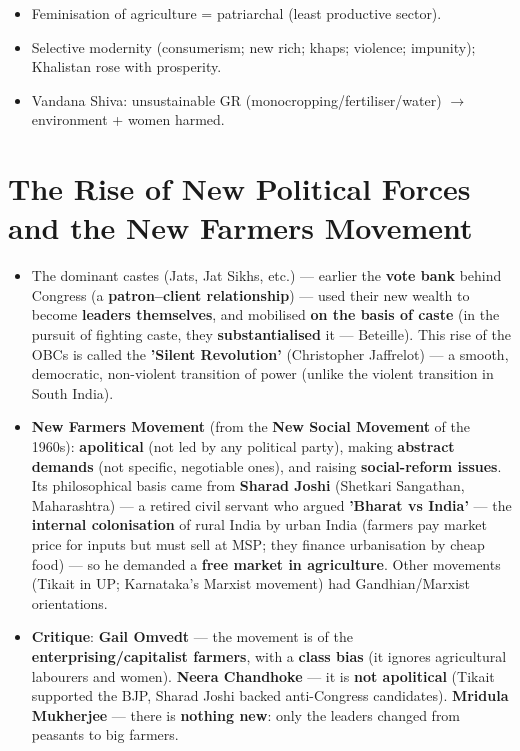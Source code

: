 \begin{QuickRevision}
\begin{itemize}
\item Feminisation of agriculture = patriarchal (least productive sector).
\item Selective modernity (consumerism; new rich; khaps; violence; impunity); Khalistan rose with prosperity.
\item Vandana Shiva: unsustainable GR (monocropping/fertiliser/water) $\rightarrow$ environment + women harmed.
\end{itemize}
\end{QuickRevision}

\section{The Rise of New Political Forces and the New Farmers Movement}

\begin{KeyConcept}
\begin{itemize}
\item The dominant castes (Jats, Jat Sikhs, etc.) --- earlier the \textbf{vote bank} behind Congress (a \textbf{patron--client relationship}) --- used their new wealth to become \textbf{leaders themselves}, and mobilised \textbf{on the basis of caste} (in the pursuit of fighting caste, they \textbf{substantialised} it --- Beteille). This rise of the OBCs is called the \textbf{'Silent Revolution'} (Christopher Jaffrelot) --- a smooth, democratic, non-violent transition of power (unlike the violent transition in South India).
\item \textbf{New Farmers Movement} (from the \textbf{New Social Movement} of the 1960s): \textbf{apolitical} (not led by any political party), making \textbf{abstract demands} (not specific, negotiable ones), and raising \textbf{social-reform issues}. Its philosophical basis came from \textbf{Sharad Joshi} (Shetkari Sangathan, Maharashtra) --- a retired civil servant who argued \textbf{'Bharat vs India'} --- the \textbf{internal colonisation} of rural India by urban India (farmers pay market price for inputs but must sell at MSP; they finance urbanisation by cheap food) --- so he demanded a \textbf{free market in agriculture}. Other movements (Tikait in UP; Karnataka's Marxist movement) had Gandhian/Marxist orientations.
\item \textbf{Critique}: \textbf{Gail Omvedt} --- the movement is of the \textbf{enterprising/capitalist farmers}, with a \textbf{class bias} (it ignores agricultural labourers and women). \textbf{Neera Chandhoke} --- it is \textbf{not apolitical} (Tikait supported the BJP, Sharad Joshi backed anti-Congress candidates). \textbf{Mridula Mukherjee} --- there is \textbf{nothing new}: only the leaders changed from peasants to big farmers.
\end{itemize}
\end{KeyConcept}

